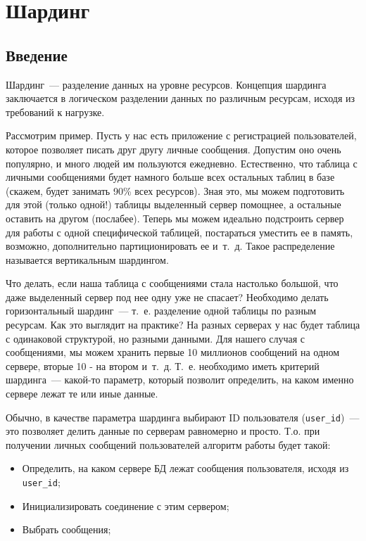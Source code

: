 \chapter{Шардинг}

\begin{epigraphs}
\end{epigraphs}

\section{Введение}

Шардинг~--- разделение данных на уровне ресурсов. Концепция шардинга заключается в логическом разделении данных по различным ресурсам, исходя из требований к нагрузке.

Рассмотрим пример. Пусть у нас есть приложение с регистрацией пользователей, которое позволяет писать друг другу личные сообщения. Допустим оно очень популярно, и много людей им пользуются ежедневно. Естественно, что таблица с личными сообщениями будет намного больше всех остальных таблиц в базе (скажем, будет занимать 90\% всех ресурсов). Зная это, мы можем подготовить для этой (только одной!) таблицы выделенный сервер помощнее, а остальные оставить на другом (послабее). Теперь мы можем идеально подстроить сервер для работы с одной специфической таблицей, постараться уместить ее в память, возможно, дополнительно партиционировать ее и~т.~д. Такое распределение называется вертикальным шардингом.

Что делать, если наша таблица с сообщениями стала настолько большой, что даже выделенный сервер под нее одну уже не спасает? Необходимо делать горизонтальный шардинг~--- т.~е. разделение одной таблицы по разным ресурсам. Как это выглядит на практике? На разных серверах у нас будет таблица с одинаковой структурой, но разными данными. Для нашего случая с сообщениями, мы можем хранить первые 10 миллионов сообщений на одном сервере, вторые 10 - на втором и~т.~д. Т.~е. необходимо иметь критерий шардинга~--- какой-то параметр, который позволит определить, на каком именно сервере лежат те или иные данные.

Обычно, в качестве параметра шардинга выбирают ID пользователя (\lstinline!user_id!)~--- это позволяет делить данные по серверам равномерно и просто. Т.о. при получении личных сообщений пользователей алгоритм работы будет такой:

\begin{itemize}
  \item Определить, на каком сервере БД лежат сообщения пользователя, исходя из \lstinline!user_id!;
  \item Инициализировать соединение с этим сервером;
  \item Выбрать сообщения;
\end{itemize}

